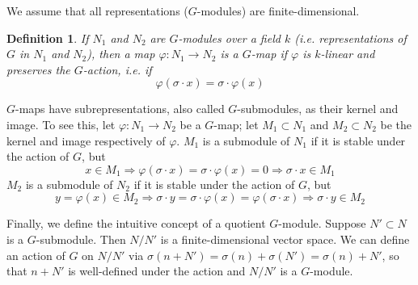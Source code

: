 \documentclass[12pt]{article}
\newtheorem{defn}{Definition}
\begin{document}
We assume that all representations ($G$-modules) are finite-dimensional.

\begin{defn} If $N_1$ and $N_2$ are $G$-modules over a field $k$ (i.e. representations of $G$ in $N_1$ and $N_2$), then a map $\varphi:N_1\to N_2$ is a \emph{$G$-map} if $\varphi$ is $k$-linear and preserves the $G$-action, i.e. if 
\[\varphi(\sigma \cdot x)=\sigma\cdot \varphi(x)\] 
\end{defn}

$G$-maps have subrepresentations, also called $G$-submodules, as their kernel and image. To see this, let $\varphi:N_1\to N_2$ be a $G$-map; let $M_1\subset N_1$ and $M_2\subset N_2$ be the kernel and image respectively of $\varphi$. $M_1$ is a submodule of $N_1$ if it is stable under the action of $G$, but
\[x\in M_1\Rightarrow \varphi(\sigma\cdot x)=\sigma\cdot\varphi(x)=0\Rightarrow \sigma\cdot x\in M_1\]
$M_2$ is a submodule of $N_2$ if it is stable under the action of $G$, but
\[y=\varphi(x)\in M_2\Rightarrow \sigma\cdot y=\sigma\cdot \varphi(x)=\varphi(\sigma\cdot x)\Rightarrow \sigma\cdot y\in M_2\]

Finally, we define the intuitive concept of a quotient $G$-module. Suppose $N'\subset N$ is a $G$-submodule. Then $N/N'$ is a finite-dimensional vector space. We can define an action of $G$ on $N/N'$ via $\sigma(n+N')=\sigma(n)+\sigma(N')=\sigma(n)+N'$, so that $n+N'$ is well-defined under the action and $N/N'$ is a $G$-module.
\end{document}
